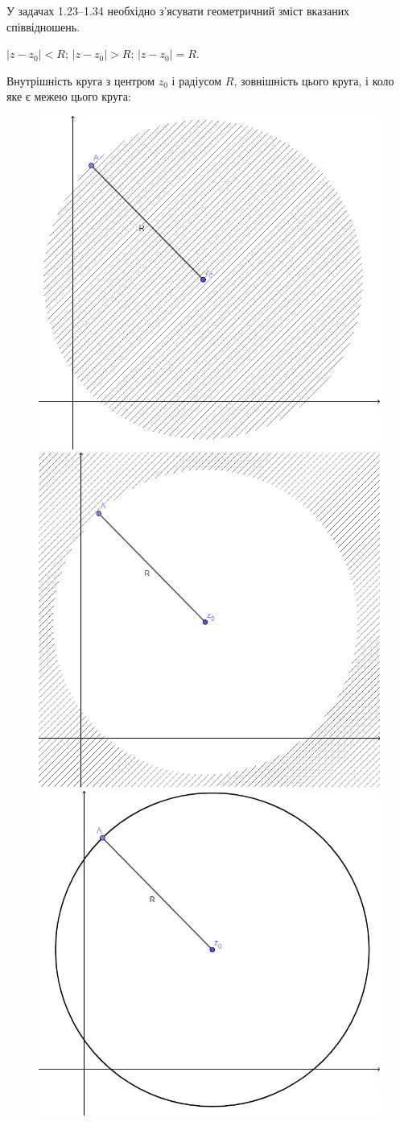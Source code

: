 




\setcounter{section}{1}

\setcounter{problem}{22}

У задачах 1.23--1.34 необхідно з'ясувати геометричний зміст вказаних співвідношень.
\begin{problem}
	$|z - z_0| < R$; $|z - z_0| > R$; $|z - z_0| = R$.
\end{problem}
\begin{solution}
	Внутрішність круга з центром $z_0$ і радіусом $R$, зовнішність цього круга, і коло яке є межею цього круга:
	\begin{figure}[H]
		\centering
		\includegraphics[width=.3\linewidth]{fig-4.png}
		\quad
		\includegraphics[width=.3\linewidth]{fig-5.png}
		\quad
		\includegraphics[width=.3\linewidth]{fig-6.png}
	\end{figure}
\end{solution}
	
